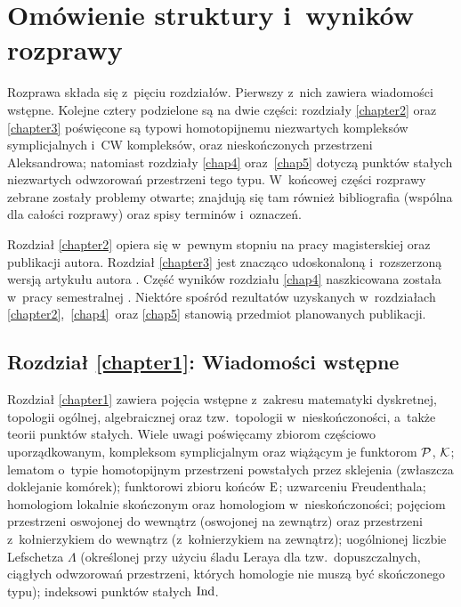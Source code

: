 
\section*{Omówienie struktury i~wyników rozprawy}
Rozprawa składa się z~pięciu rozdziałów. Pierwszy z~nich zawiera wiadomości wstępne. Kolejne cztery podzielone są na dwie części: rozdziały \ref{chapter2} oraz \ref{chapter3} poświęcone są typowi homotopijnemu niezwartych kompleksów symplicjalnych i~CW kompleksów, oraz nieskończonych przestrzeni Aleksandrowa; natomiast rozdziały \ref{chap4} oraz~\ref{chap5} dotyczą punktów stałych niezwartych odwzorowań przestrzeni tego typu. W~końcowej części rozprawy zebrane zostały problemy otwarte; znajdują się tam również bibliografia (wspólna dla całości rozprawy) oraz spisy terminów i~oznaczeń.

Rozdział \ref{chapter2} opiera się w~pewnym stopniu na pracy magisterskiej \cite{Kukiela10a} oraz publikacji \cite{Kukiela10} autora. Rozdział \ref{chapter3} jest znacząco udoskonaloną i~rozszerzoną wersją artykułu autora \cite{Kukiela13}. Część wyników rozdziału \ref{chap4} naszkicowana została w~pracy semestralnej \cite{Kukiela12}. Niektóre spośród rezultatów uzyskanych w~rozdziałach \ref{chapter2},~\ref{chap4}~oraz \ref{chap5} stanowią przedmiot planowanych publikacji.

\subsection*{Rozdział \ref{chapter1}: Wiadomości wstępne}
Rozdział \ref{chapter1} zawiera pojęcia wstępne z~zakresu matematyki dyskretnej, topologii ogólnej, algebraicznej oraz tzw.~topologii w~nieskończoności, a~także teorii punktów stałych. Wiele uwagi poświęcamy zbiorom częściowo uporządkowanym, kompleksom symplicjalnym oraz wiążącym je funktorom $\mathcal{P}$, $\mathcal{K}$; lematom o~typie homotopijnym przestrzeni powstałych przez sklejenia (zwłaszcza doklejanie komórek); funktorowi zbioru końców $\mathrm{E}$; uzwarceniu Freudenthala; homologiom lokalnie skończonym oraz homologiom w~nieskończoności; pojęciom przestrzeni oswojonej do wewnątrz (oswojonej na zewnątrz) oraz przestrzeni z~kołnierzykiem do wewnątrz (z~kołnierzykiem na zewnątrz); uogólnionej liczbie Lefschetza $\Lambda$ (określonej przy użyciu śladu Leraya dla tzw.~dopuszczalnych, ciągłych odwzorowań przestrzeni, których homologie nie muszą być skończonego typu); indeksowi punktów stałych $\operatorname{Ind}$.


